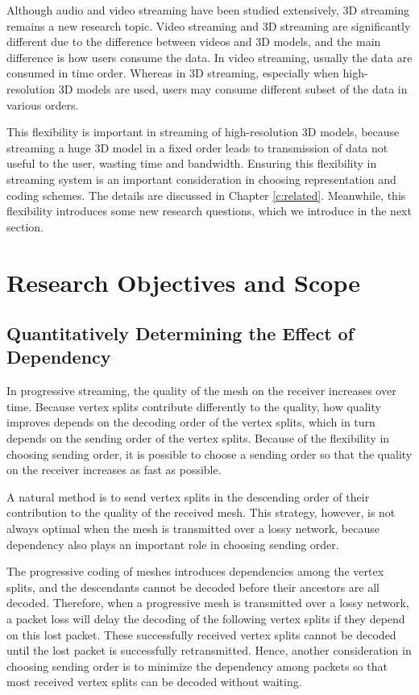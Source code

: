     Although audio and video streaming have been studied extensively, 
    3D streaming remains a new research topic. 
    Video streaming and 3D streaming are significantly different
    due to the difference between videos and 3D models, and
    the main difference is how users consume the data.
    In video streaming, usually the data are consumed in time order. 
    Whereas in 3D streaming, especially when high-resolution 3D models are used,
    users may consume different subset of the data in various orders.
    
    This flexibility is important in streaming of high-resolution 3D models, 
    because streaming a huge 3D model in a fixed order leads to transmission of data not
    useful to the user, wasting time and bandwidth.
    Ensuring this flexibility in streaming system is an important consideration
    in choosing representation and coding schemes. The details are discussed
    in Chapter \ref{c:related}.
    Meanwhile, this flexibility introduces some new research questions, 
    which we introduce in the next section. 

  \section{Research Objectives and Scope}
  \label{s:intro:objectives}
    \subsection{Quantitatively Determining the Effect of Dependency}
    In progressive streaming, the quality of the mesh on the receiver
    increases over time.
    Because vertex splits contribute differently to the quality, 
    how quality improves
    depends on the decoding order of the vertex splits,
    which in turn depends on the sending order of the vertex splits.
    Because of the flexibility in choosing sending order,
    it is possible to choose a sending order so that the 
    quality on the receiver increases as fast as possible.

    A natural method is to send vertex splits in the descending order
    of their contribution to the quality of the received mesh. 
    This strategy, however, is not always optimal 
    when the mesh is transmitted over a lossy network,
    because dependency also plays an important role in choosing sending order.
    
    The progressive coding of meshes introduces dependencies among 
    the vertex splits, and the descendants cannot be decoded
    before their ancestors are all decoded. Therefore, 
    when a progressive mesh is transmitted over a lossy network,
    a packet loss will delay the decoding of the following
    vertex splits if they depend on this lost packet. 
    These successfully received vertex splits cannot be 
    decoded until the lost packet is successfully retransmitted. 
    Hence, another consideration in choosing sending order
    is to minimize the dependency among packets so that most
    received vertex splits can be decoded without waiting.
    
